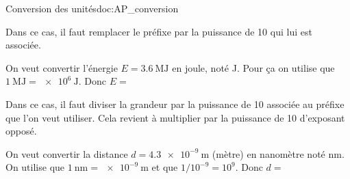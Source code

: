 \begin{doc}{Conversion des unités}{doc:AP_conversion}

  Dans ce cas, il faut remplacer le préfixe par la puissance de 10 qui lui est associée.
  
  \exemple On veut convertir l'énergie $E = \qty{3,6}{\mega\joule}$ en joule, noté \unit{\joule}.
  Pour ça on utilise que $\qty{1}{\mega\joule} = \qty{e6}{\joule}$.
  Donc $E =$ 

  \bigskip

  Dans ce cas, il faut diviser la grandeur par la puissance de 10 associée au préfixe que l'on veut utiliser.
  Cela revient à multiplier par la puissance de 10 d'exposant opposé.

  \exemple On veut convertir la distance $d = \qty{4,3e-9}{\m}$ (mètre) en nanomètre noté \unit{nm}.
  On utilise que $\qty{1}{\nano\m} = \qty{e-9}{\m}$ et que $1 / 10^{-9} = 10^9$. 
  Donc $d = $ 
\end{doc}







